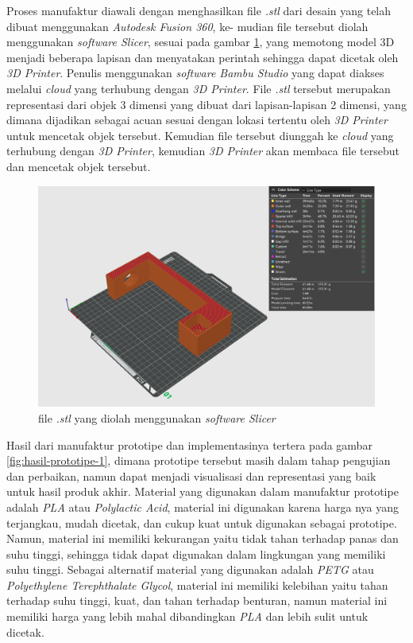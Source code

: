 Proses manufaktur diawali dengan menghasilkan file \textit{.stl} dari desain yang telah dibuat menggunakan \textit{Autodesk Fusion 360}, ke- mudian
file tersebut diolah menggunakan \textit{software Slicer}, sesuai pada gambar \ref{fig:bambu-studio},
yang memotong model 3D menjadi beberapa lapisan dan menyatakan perintah sehingga dapat dicetak oleh \textit{3D Printer}. 
Penulis menggunakan \textit{software Bambu Studio} yang dapat diakses melalui \textit{cloud} yang 
terhubung dengan \textit{3D Printer}. File \textit{.stl} tersebut merupakan representasi dari objek 3 dimensi yang dibuat dari lapisan-lapisan
2 dimensi, yang dimana dijadikan sebagai acuan sesuai dengan lokasi tertentu oleh \textit{3D Printer} 
untuk mencetak objek tersebut. Kemudian file tersebut diunggah ke \textit{cloud} yang terhubung dengan
\textit{3D Printer}, kemudian \textit{3D Printer} akan membaca file tersebut dan mencetak objek tersebut.

\begin{figure}[H]
  \centering
  \includegraphics[width=0.7\linewidth]{gambar/bambu-studio.png}
  \caption{file \textit{.stl} yang diolah menggunakan \textit{software Slicer}}
  \label{fig:bambu-studio}
\end{figure}

Hasil dari manufaktur prototipe dan implementasinya tertera pada gambar \ref{fig:hasil-prototipe-1}, dimana prototipe tersebut masih dalam tahap pengujian 
dan perbaikan, namun dapat menjadi visualisasi dan representasi yang baik untuk hasil produk akhir. Material yang digunakan dalam manufaktur prototipe adalah \textit{PLA} atau \textit{Polylactic Acid},
material ini digunakan karena harga nya yang terjangkau, mudah dicetak, dan cukup kuat untuk digunakan
sebagai prototipe. Namun, material ini memiliki kekurangan yaitu tidak tahan terhadap panas dan
suhu tinggi, sehingga tidak dapat digunakan dalam lingkungan yang memiliki suhu tinggi. Sebagai 
alternatif material yang digunakan adalah \textit{PETG} atau \textit{Polyethylene Terephthalate Glycol},
material ini memiliki kelebihan yaitu tahan terhadap suhu tinggi, kuat, dan tahan terhadap benturan,
namun material ini memiliki harga yang lebih mahal dibandingkan \textit{PLA} dan lebih sulit untuk
dicetak.

